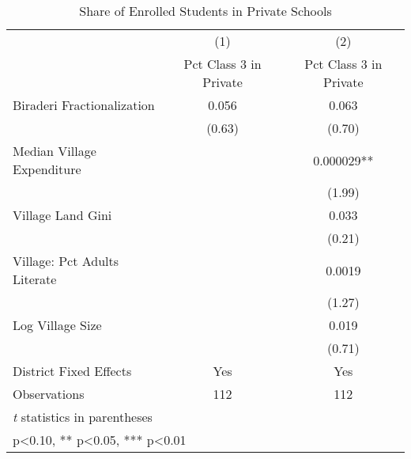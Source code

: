 \begin{table}[htbp]\centering
\def\sym#1{\ifmmode^{#1}\else\(^{#1}\)\fi}
\caption{Share of Enrolled Students in Private Schools \label{privateshare}}
\begin{tabular}{l*{2}{c}}
\toprule
                &\multicolumn{1}{c}{(1)}&\multicolumn{1}{c}{(2)}\\
                &\multicolumn{1}{c}{Pct Class 3 in Private}&\multicolumn{1}{c}{Pct Class 3 in Private}\\
\midrule
Biraderi Fractionalization&    0.056   &    0.063   \\
                &   (0.63)   &   (0.70)   \\
Median Village Expenditure&            & 0.000029** \\
                &            &   (1.99)   \\
Village Land Gini&            &    0.033   \\
                &            &   (0.21)   \\
Village: Pct Adults Literate&            &   0.0019   \\
                &            &   (1.27)   \\
Log Village Size&            &    0.019   \\
                &            &   (0.71)   \\
District Fixed Effects&      Yes   &      Yes   \\
\midrule
Observations    &      112   &      112   \\
\bottomrule
\multicolumn{3}{l}{\footnotesize \textit{t} statistics in parentheses}\\
\multicolumn{3}{l}{\footnotesize * p<0.10, ** p<0.05, *** p<0.01}\\
\end{tabular}
\end{table}
